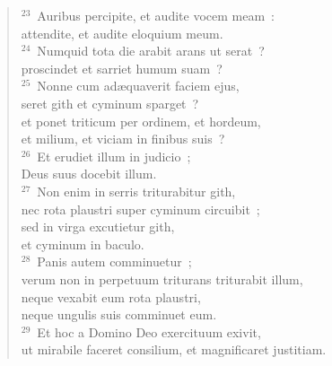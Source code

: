 \begin{verse}${}^{23}$~Auribus percipite, et audite vocem meam~:\\ attendite, et audite eloquium meum.\\
${}^{24}$~Numquid tota die arabit arans ut serat~?\\ proscindet et sarriet humum suam~?\\
${}^{25}$~Nonne cum ad\ae quaverit faciem ejus,\\ seret gith et cyminum sparget~?\\ et ponet triticum per ordinem, et hordeum,\\ et milium, et viciam in finibus suis~?\\
${}^{26}$~Et erudiet illum in judicio~;\\ Deus suus docebit illum.\\
${}^{27}$~Non enim in serris triturabitur gith,\\ nec rota plaustri super cyminum circuibit~;\\ sed in virga excutietur gith,\\ et cyminum in baculo.\\
${}^{28}$~Panis autem comminuetur~;\\ verum non in perpetuum triturans triturabit illum,\\ neque vexabit eum rota plaustri,\\ neque ungulis suis comminuet eum.\\
${}^{29}$~Et hoc a Domino Deo exercituum exivit,\\ ut mirabile faceret consilium, et magnificaret justitiam.\end{verse}


